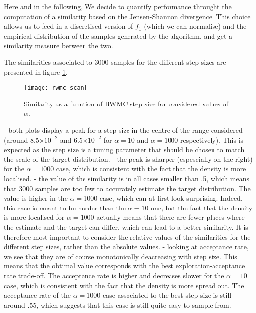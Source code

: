 \documentclass[a4paper, 12pt,oneside]{article}
\begin{document}
			Here and in the following, We decide to quantify performance throught the computation of a similarity based on the Jensen-Shannon divergence. This choice allows us to feed in a discretised version of $f_1$ (which we can normalise) and the empirical distribution of the samples generated by the algorithm, and get a similarity measure between the two.

			The similarities associated to 3000 samples for the different step sizes are presented in figure \ref{fig:rwmc-scan}.
			\begin{figure}[htb]
				\centering
					\vspace{0em}
					\texttt{[image: rwmc\_scan]}
					\caption{Similarity as a function of RWMC step size for considered values of $\alpha$.}
					\label{fig:rwmc-scan}
			\end{figure}

			- both plots display a peak for a step size in the centre of the range considered (around 8.5$\times 10^{-2}$ and 6.5$\times 10^{-2}$ for $\alpha=10$ and $\alpha=1000$ respectively). This is expected as the step size is a tuning parameter that should be chosen to match the scale of the target distribution.
			- the peak is sharper (espescially on the right) for the $\alpha=1000$ case, which is consistent with the fact that the density is more localised. 
			- the value of the similarity is in all cases smaller than .5, which means that 3000 samples are too few to accurately estimate the target distribution. The value is higher in the $\alpha=1000$ case, which can at first look surprising. Indeed, this case is meant to be harder than the $\alpha=10$ one, but the fact that the density is more localised for $\alpha=1000$ actually means that there are fewer places where the estimate and the target can differ, which can lead to a better similarity. It is therefore most important to consider the relative values of the similarities for the different step sizes, rather than the absolute values.
			- looking at acceptance rate, we see that they are of course monotonically deacreasing with step size. This means that the obtimal value corresponds with the best exploration-acceptance rate trade-off. The acceptance rate is higher and decreases slower for the $\alpha=10$ case, which is consistent with the fact that the density is more spread out. The acceptance rate of the $\alpha=1000$ case associated to the best step size is still around .55, which suggests that this case is still quite easy to sample from. 
\end{document}
